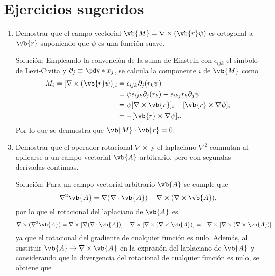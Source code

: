 
\section{Ejercicios sugeridos}

\begin{enumerate}[label=\textbf{Ejercicio \thechapter.\arabic*},resume]
\item Demostrar que el campo vectorial $\vb{M} = \nabla\times(\vb{r}\psi)$ es ortogonal a $\vb{r}$ suponiendo que $\psi$ es una función suave.
\label{ex:m.r=0}
\item[\color{blue} Solución:]
	Empleando la convención de la suma de Einstein con $\epsilon_{ijk}$ el símbolo de  Levi-Civita y $\partial_j \equiv \pdv*{ }{x_j}$, se calcula la componente $i$ de $\vb{M}$ como
	\begin{align*}
	M_i = [\nabla\times(\vb{r}\psi)]_i &=  \epsilon_{ijk}\partial_j(r_k\psi)\\
	& =\psi\epsilon_{ijk}\partial_j(r_k) -\epsilon_{ikj}r_k\partial_j\psi \\
	& =\psi[\nabla\times\vb{r}]_i - [\vb{r}\times\nabla\psi]_i \\
	&= - [\vb{r}\times\nabla\psi]_i.
	\end{align*}
	Por lo que se demuestra que $\vb{M}\cdot\vb{r} = 0$.	
%
\item Demostrar que el operador rotacional $\nabla\times$ y el laplaciano $\nabla^2$ conmutan al aplicarse a un campo vectorial $\vb{A}$ arbitrario, pero con segundas derivadas continuas.
\label{ex:lap-rot}
\item[\color{blue} Solución:]
	Para un campo vectorial arbitrario $\vb{A}$ se cumple que 
	\begin{align*}
	\nabla^2\vb{A} = \nabla(\nabla\cdot\vb{A}) - \nabla\times(\nabla\times\vb{A}),
	\end{align*}
 por lo que el rotacional del laplaciano de $\vb{A}$ es 
	\begin{align*}
\nabla\times( \nabla^2\vb{A})=\nabla\times[\nabla(\nabla\cdot\vb{A})  ]-  \nabla\times[\nabla\times(\nabla\times \vb{A})] = -  \nabla\times[\nabla\times(\nabla\times \vb{A})]
	\end{align*}
ya que el  rotacional del gradiente de cualquier función es nulo. Además, al sustituir $\vb{A}\to \nabla\times\vb{A}$ en la expresión del laplaciano de $\vb{A}$ y  considerando que la divergencia del rotacional de cualquier función es nulo, se obtiene que 
	\begin{align*}

\end{align*}
\end{enumerate}
